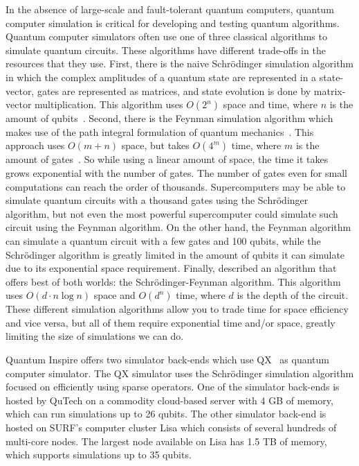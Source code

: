 In the absence of large-scale and fault-tolerant quantum computers, quantum computer simulation is critical for developing and testing quantum algorithms.
Quantum computer simulators often use one of three classical algorithms to simulate quantum circuits.
These algorithms have different trade-offs in the resources that they use.
First, there is the naive Schr{\"o}dinger simulation algorithm in which the complex amplitudes of a quantum state are represented in a state-vector, gates are represented as matrices, and state evolution is done by matrix-vector multiplication.
This algorithm uses $O(2^n)$ space and time, where $n$ is the amount of qubits~\cite{aaronson2016complexity}.
Second, there is the Feynman simulation algorithm which makes use of the path integral formulation of quantum mechanics~\cite{feynman2005space}.
This approach uses $O(m+n)$ space, but takes $O(4^m)$ time, where $m$ is the amount of gates~\cite{aaronson2016complexity}.
So while using a linear amount of space, the time it takes grows exponential with the number of gates.
The number of gates even for small computations can reach the order of thousands.
Supercomputers may be able to simulate quantum circuits with a thousand gates using the Schr{\"o}dinger  algorithm, but not even the most powerful supercomputer could simulate such circuit using the Feynman algorithm.
On the other hand, the Feynman algorithm can simulate a quantum circuit with a few gates and 100 qubits, while the Schr{\"o}dinger algorithm is greatly limited in the amount of qubits it can simulate due to its exponential space requirement.
Finally, \textcite{aaronson2016complexity} described an algorithm that offers best of both worlds: the Schr{\"o}dinger-Feynman algorithm.
This algorithm uses $O(d \cdot n \log n)$ space and $O(d^n)$ time, where $d$ is the depth of the circuit.
These different simulation algorithms allow you to trade time for space efficiency and vice versa, but all of them require exponential time and/or space, greatly limiting the size of simulations we can do.

Quantum Inspire offers two simulator back-ends which use QX~\cite{khammassi2017qx} as quantum computer simulator.
The QX simulator uses the Schr{\"o}dinger simulation algorithm focused on efficiently using sparse operators.
One of the simulator back-ends is hosted by QuTech on a commodity cloud-based server with 4 GB of memory, which can run simulations up to 26 qubits.
The other simulator back-end is hosted on SURF's computer cluster Lisa which consists of several hundreds of multi-core nodes.
The largest node available on Lisa has 1.5 TB of memory, which supports simulations up to 35 qubits.

